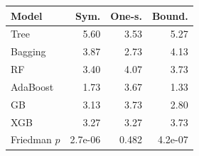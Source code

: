 \begin{tabular}{@{}lrrr@{}}
\toprule
Model & Sym. & One-s. & Bound. \\
\midrule
Tree & 5.60 & 3.53 & 5.27 \\
Bagging & 3.87 & 2.73 & 4.13 \\
RF & 3.40 & 4.07 & 3.73 \\
AdaBoost & 1.73 & 3.67 & 1.33 \\
GB & 3.13 & 3.73 & 2.80 \\
XGB & 3.27 & 3.27 & 3.73 \\
\midrule
Friedman $p$ & 2.7e-06 & 0.482 & 4.2e-07 \\
\bottomrule
\end{tabular}